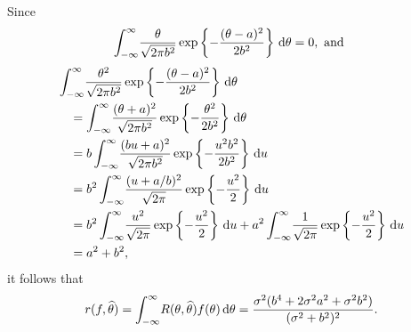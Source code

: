 \begin{ex}
\begin{enumerate}[(a)]
          Since
          \[
            \int_{-\infty}^\infty\!
            \frac{\theta}{\sqrt{2\pi b^2}}
            \exp\left\{-\frac{(\theta-a)^2}{2b^2}\right\}\,\mathrm{d}{\theta}
            =0,\text{ and }
          \]
          \begin{align*}
             & \int_{-\infty}^\infty\!
            \frac{\theta^2}{\sqrt{2\pi b^2}}
            \exp\left\{-\frac{(\theta-a)^2}{2b^2}\right\}\,\mathrm{d}{\theta} \\
             & \quad = \int_{-\infty}^\infty\!
            \frac{(\theta+a)^2}{\sqrt{2\pi b^2}}
            \exp\left\{-\frac{\theta^2}{2b^2}\right\}\,\mathrm{d}{\theta}     \\
             & \quad =b\int_{-\infty}^\infty\!
            \frac{(bu+a)^2}{\sqrt{2\pi b^2}}
            \exp\left\{-\frac{u^2b^2}{2b^2}\right\}\,\mathrm{d}{u}            \\
             & \quad =b^2\int_{-\infty}^\infty\!
            \frac{(u+a/b)^2}{\sqrt{2\pi}}
            \exp\left\{-\frac{u^2}{2}\right\}\,\mathrm{d}{u}                  \\
             & \quad =b^2\int_{-\infty}^\infty\!
            \frac{u^2}{\sqrt{2\pi}}
            \exp\left\{-\frac{u^2}{2}\right\}\,\mathrm{d}{u}
            +a^2\int_{-\infty}^\infty\!
            \frac{1}{\sqrt{2\pi}}
            \exp\left\{-\frac{u^2}{2}\right\}\,\mathrm{d}{u}                  \\
             & \quad=a^2+b^2,
          \end{align*}
          it follows that
          \[
            r(f,\widehat{\theta})
            =\int_{-\infty}^\infty\!R(\theta,\widehat{\theta})f(\theta)\,\mathrm{d}{\theta}
            =\frac{\sigma^2(b^4+2\sigma^2a^2+\sigma^2b^2)}{(\sigma^2+b^2)^2}.
          \]
  \end{enumerate}
\end{ex}

